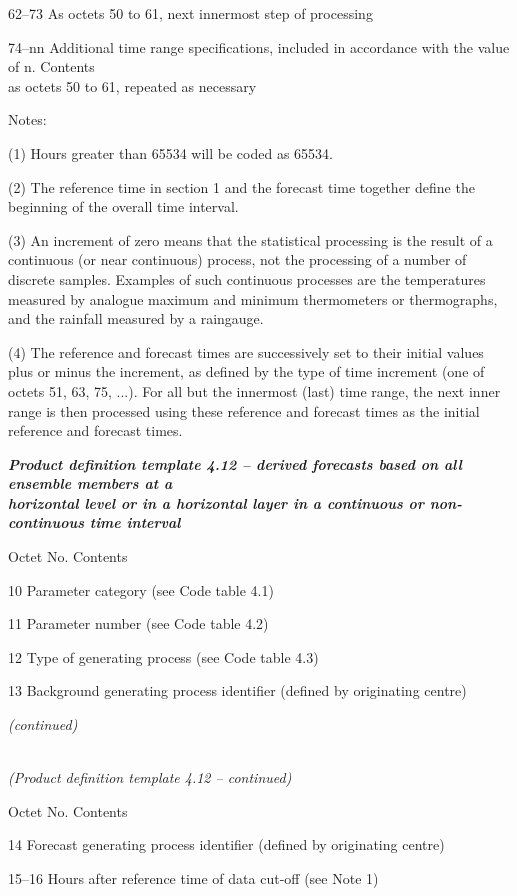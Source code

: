 62--73 As octets 50 to 61, next innermost step of processing

74--nn Additional time range specifications, included in accordance with the value of n. Contents\\
as octets 50 to 61, repeated as necessary

Notes:

(1) Hours greater than 65534 will be coded as 65534.

(2) The reference time in section 1 and the forecast time together define the beginning of the overall time interval.

(3) An increment of zero means that the statistical processing is the result of a continuous (or near continuous) process, not the processing of a number of discrete samples. Examples of such continuous processes are the temperatures measured by analogue maximum and minimum thermometers or thermographs, and the rainfall measured by a raingauge.

(4) The reference and forecast times are successively set to their initial values plus or minus the increment, as defined by the type of time increment (one of octets 51, 63, 75, ...). For all but the innermost (last) time range, the next inner range is then processed using these reference and forecast times as the initial reference and forecast times.

\emph{\textbf{Product definition template 4.12 -- derived forecasts based on all ensemble members at a\\
horizontal level or in a horizontal layer in a continuous or non-\\
continuous time interval}}

Octet No. Contents

10 Parameter category (see Code table 4.1)

11 Parameter number (see Code table 4.2)

12 Type of generating process (see Code table 4.3)

13 Background generating process identifier (defined by originating centre)

\emph{(continued)}

\emph{\\
(Product definition template 4.12 -- continued)}

Octet No. Contents

14 Forecast generating process identifier (defined by originating centre)

15--16 Hours after reference time of data cut-off (see Note 1)

